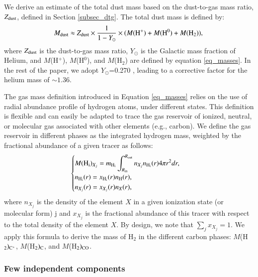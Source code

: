 \documentclass{aa}
\begin{document}
We derive an estimate of the total dust mass based on the dust-to-gas mass ratio, $Z_{\rm dust}$, defined in Section \ref{subsec_dtg}. The total dust mass is defined by:
\begin{equation}
    \displaystyle M_{\rm dust} \approx Z_{\rm dust} \times \frac{1}{1-Y_{\odot}} \times (M({\rm H^+}) + M({\rm H^0}) + M({\rm H_2})), \\
\end{equation}
where $Z_{\rm dust}$ is the dust-to-gas mass ratio, $Y_{\odot}$ is the Galactic mass fraction of Helium, and $M$(H$^+$),  $M$(H$^0$), and $M$(H$_2$) are defined by equation \ref{eq_masses}. In the rest of the paper, we adopt $Y_{\odot}$=0.270 \citep{Asplund_2009}, leading to a corrective factor for the helium mass of $\sim 1.36$.

The gas mass definition introduced in Equation \ref{eq_masses} relies on the use of radial abundance profile of hydrogen atoms, under different states. This definition is flexible and can easily be adapted to trace the gas reservoir of ionized, neutral, or molecular gas associated with other elements (e.g., carbon). We define the gas reservoir in different phases as the integrated hydrogen mass, weighted by the fractional abundance of a given tracer as follows:
\begin{equation}
    \label{eq_masses_zone}
    \begin{cases}
    \displaystyle M({\rm H_i})_{X_j} = m_{\rm H_i} \int_{R_{\rm in}}^{R_{\rm out}}n_{X_j} n_{\rm H_i}(r) 4\pi r^2 dr , \\
    \displaystyle n_{\rm H_i}(r) = x_{\rm H_i}(r) n_{\rm H}(r), \\
    \displaystyle n_{X_j}(r) = x_{X_j}(r) n_{X}(r), 
    \end{cases}    
\end{equation}
where $n_{X_j}$ is the density of the element $X$ in a given ionization state (or molecular form) j and $x_{X_j}$ is the fractional abundance of this tracer with respect to the total density of the element $X$. By design, we note that $\sum_{j} x_{X_j}=1$. We apply this formula to derive the mass of H$_2$ in the different carbon phases: $M$(H$_2)_{\rm C^+}$, $M$(H$_2)_{\rm C}$, and $M$(H$_2)_{\rm CO}$. 

\subsubsection{Few independent components}
\label{subsec_multi_comp}
\end{document}
